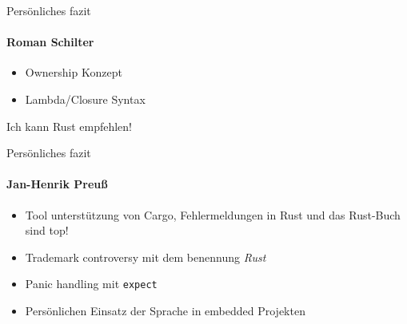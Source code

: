 \begin{frame}{Persönliches fazit}
    \framesubtitle{Roman Schilter}

    \begin{itemize}
        \item Ownership Konzept \pause
        \item Lambda/Closure Syntax \pause
    \end{itemize}

    \pause
    Ich kann Rust empfehlen!



\end{frame}

\begin{frame}{Persönliches fazit}
    \framesubtitle{Jan-Henrik Preuß}
    \begin{itemize}
        \item Tool unterstützung von Cargo, Fehlermeldungen in Rust und das Rust-Buch sind top! \pause
        \item Trademark controversy mit dem benennung \textit{Rust} \pause
        \item Panic handling mit \texttt{expect} \pause
        \item Persönlichen Einsatz der Sprache in embedded Projekten
    \end{itemize}
\end{frame}
